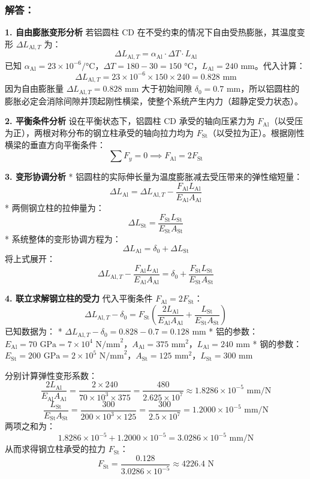 \documentclass[UTF8,fontset=windows]{ctexart}
\begin{document}
\subsubsection*{解答：}

\textbf{1. 自由膨胀变形分析}
若铝圆柱 CD 在不受约束的情况下自由受热膨胀，其温度变形 $\Delta L_{\text{Al}, T}$ 为：
\[
    \Delta L_{\text{Al}, T} = \alpha_{\text{Al}} \cdot \Delta T \cdot L_{\text{Al}}
\]
已知 $\alpha_{\text{Al}} = 23 \times 10^{-6}/\text{°C}$，$\Delta T = 180 - 30 = 150\text{ °C}$，$L_{\text{Al}} = 240\text{ mm}$。代入计算：
\[
    \Delta L_{\text{Al}, T} = 23 \times 10^{-6} \times 150 \times 240 = 0.828\text{ mm}
\]
因为自由膨胀量 $\Delta L_{\text{Al}, T} = 0.828\text{ mm}$ 大于初始间隙 $\delta_0 = 0.7\text{ mm}$，所以铝圆柱的膨胀必定会消除间隙并顶起刚性横梁，使整个系统产生内力（超静定受力状态）。

\textbf{2. 平衡条件分析}
设在平衡状态下，铝圆柱 CD 承受的轴向压紧力为 $F_{\text{Al}}$（以受压为正），两根对称分布的钢立柱承受的轴向拉力均为 $F_{\text{St}}$（以受拉为正）。根据刚性横梁的垂直方向平衡条件：
\[
    \sum F_y = 0 \implies F_{\text{Al}} = 2 F_{\text{St}}
\]

\textbf{3. 变形协调分析}
*   铝圆柱的实际伸长量为温度膨胀减去受压带来的弹性缩短量：
    \[
        \Delta L_{\text{Al}} = \Delta L_{\text{Al}, T} - \frac{F_{\text{Al}} L_{\text{Al}}}{E_{\text{Al}} A_{\text{Al}}}
    \]
*   两侧钢立柱的拉伸量为：
    \[
        \Delta L_{\text{St}} = \frac{F_{\text{St}} L_{\text{St}}}{E_{\text{St}} A_{\text{St}}}
    \]
*   系统整体的变形协调方程为：
    \[
        \Delta L_{\text{Al}} = \delta_0 + \Delta L_{\text{St}}
    \]
    将上式展开：
    \[
        \Delta L_{\text{Al}, T} - \frac{F_{\text{Al}} L_{\text{Al}}}{E_{\text{Al}} A_{\text{Al}}} = \delta_0 + \frac{F_{\text{St}} L_{\text{St}}}{E_{\text{St}} A_{\text{St}}}
    \]

\textbf{4. 联立求解钢立柱的受力}
代入平衡条件 $F_{\text{Al}} = 2 F_{\text{St}}$：
\[
    \Delta L_{\text{Al}, T} - \delta_0 = F_{\text{St}} \left( \frac{2 L_{\text{Al}}}{E_{\text{Al}} A_{\text{Al}}} + \frac{L_{\text{St}}}{E_{\text{St}} A_{\text{St}}} \right)
\]
已知数据为：
*   $\Delta L_{\text{Al}, T} - \delta_0 = 0.828 - 0.7 = 0.128\text{ mm}$
*   铝的参数：$E_{\text{Al}} = 70\text{ GPa} = 7 \times 10^4\text{ N/mm}^2$，$A_{\text{Al}} = 375\text{ mm}^2$，$L_{\text{Al}} = 240\text{ mm}$
*   钢的参数：$E_{\text{St}} = 200\text{ GPa} = 2 \times 10^5\text{ N/mm}^2$，$A_{\text{St}} = 125\text{ mm}^2$，$L_{\text{St}} = 300\text{ mm}$

分别计算弹性变形系数：
\[
    \frac{2 L_{\text{Al}}}{E_{\text{Al}} A_{\text{Al}}} = \frac{2 \times 240}{70 \times 10^3 \times 375} = \frac{480}{2.625 \times 10^7} \approx 1.8286 \times 10^{-5}\text{ mm/N}
\]
\[
    \frac{L_{\text{St}}}{E_{\text{St}} A_{\text{St}}} = \frac{300}{200 \times 10^3 \times 125} = \frac{300}{2.5 \times 10^7} = 1.2000 \times 10^{-5}\text{ mm/N}
\]
两项之和为：
\[
    1.8286 \times 10^{-5} + 1.2000 \times 10^{-5} = 3.0286 \times 10^{-5}\text{ mm/N}
\]
从而求得钢立柱承受的拉力 $F_{\text{St}}$：
\[
    F_{\text{St}} = \frac{0.128}{3.0286 \times 10^{-5}} \approx 4226.4\text{ N}
\]
\end{document}
